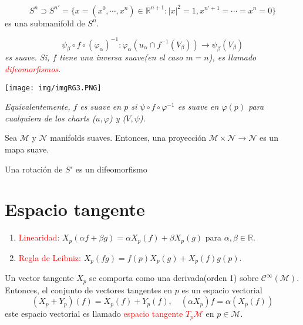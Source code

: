 \documentclass[../main]{subfiles}
\begin{document}
\ejemplo{} 
\begin{equation}
    S^n \supset S^{n'}=\{ x=(x^0, \cdots, x^n)\in \mathbb{R}^{n+1}:|x|^2=1, x^{n'+1}=\cdots=x^n=0\}
\end{equation}
es una submanifold de $S^n$.

\begin{equation}
    \psi_{\beta}\circ f \circ (\varphi_{\alpha})^{-1}: \varphi_{\alpha}(u_{\alpha} \cap f^{-1}(V_{\beta}))\rightarrow \psi_{\beta}(V_{\beta})
\end{equation}
\textit{es suave. Si, $f$ tiene una inversa suave(en el caso $m=n$), es llamado \textcolor{red}{difeomorfismos}.}

\begin{center}
    \texttt{[image: img/imgRG3.PNG]}
\end{center}

\textit{Equivalentemente, $f$ es suave en $p$ si $\psi \circ f\circ \varphi^{-1}$ es suave en $\varphi(p)$ para cualquiera de los charts ($u, \varphi$) y ($V, \psi$).}

\ejemplo{}
Sea $\mathcal{M}$ y $\mathcal{N}$ manifolds suaves. Entonces, una proyección $\mathcal{M} \times \mathcal{N} \rightarrow \mathcal{N}$ es un mapa suave.

\ejemplo{}
Una rotación de $S'$ es un difeomorfismo

\section{Espacio tangente}\label{part1.3}
\begin{enumerate}
    \item \textcolor{red}{Linearidad:} $X_p(\alpha f+\beta g)=\alpha X_p(f)+\beta X_p(g)$ para $\alpha, \beta \in \mathbb{R}$.
    \item \textcolor{red}{Regla de Leibniz:} $X_p(fg)=f(p)X_p(g)+X_p(f)g(p)$.
\end{enumerate}

Un vector tangente $X_p$ se comporta como una derivada(orden 1) sobre $\mathcal{C}^{\infty}(\mathcal{M})$. Entonces, el conjunto de vectores tangentes en $p$ es un espacio vectorial
\begin{equation}
    (X_p+Y_p)(f)=X_p(f)+Y_p(f),\quad (\alpha X_p)f=\alpha(X_p(f))
\end{equation}
este espacio vectorial es llamado \textcolor{red}{espacio tangente $T_p \mathcal{M}$} en $p\in \mathcal{M}$.
\end{document}
